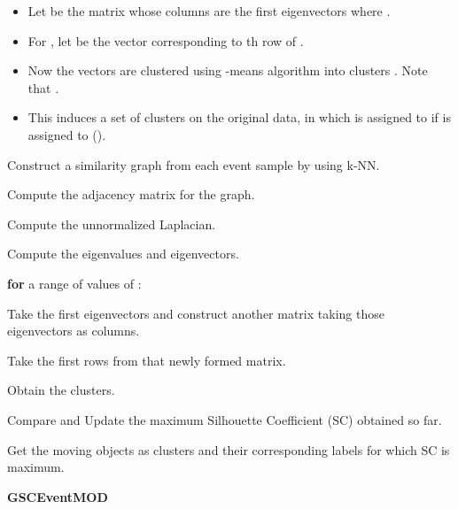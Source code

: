 \documentclass{article}
\begin{document}
\begin{itemize}[leftmargin=*]
    \itemsep0em
    \item Let  be the matrix whose columns are the first  eigenvectors  where .
    \item For , let  be the vector corresponding to th row of .
    \item Now the vectors  are clustered using -means algorithm into  clusters . Note that . 
    \item This induces a set of clusters  on the original data, in which  is assigned to  if  is assigned to  (\cite{tung2010enabling}).
    
\end{itemize}

\begin{algorithm}[]

\nl  Construct a similarity graph from each event sample by using k-NN.

\nl Compute the adjacency matrix for the graph.

\nl Compute the unnormalized Laplacian.

\nl Compute the eigenvalues and eigenvectors.

\nl \SetKwFor{}{}{}{}\textbf{for} a range of values of :

\hspace{\parindent}  Take the first  eigenvectors and construct another matrix taking those eigenvectors as
columns.

\hspace{\parindent}   Take the first  rows from that newly formed matrix.

\hspace{\parindent}   Obtain the clusters. 

\hspace{\parindent}   Compare and Update the maximum Silhouette Coefficient (SC) obtained so far.

\nl Get the moving objects as clusters and their corresponding labels for which SC is maximum.

    \caption{{\bf GSCEventMOD} \label{GSCEventMOD}}

\end{algorithm}
    
\end{document}
